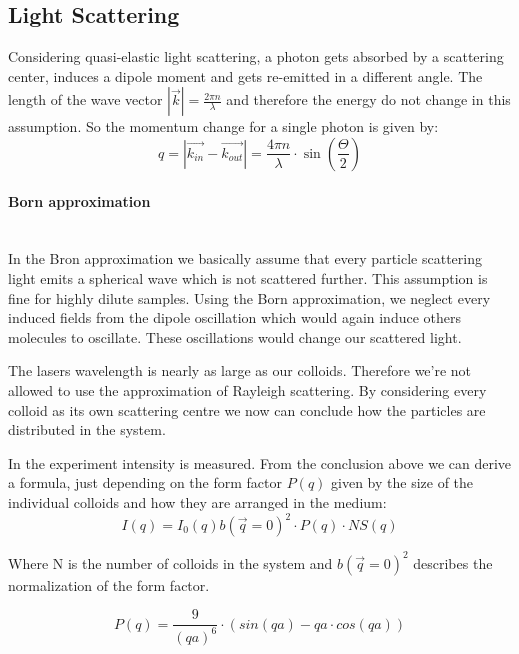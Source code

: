 \documentclass[]{article}
\begin{document}
\subsection{Light Scattering}
Considering quasi-elastic light scattering, a photon gets absorbed by a scattering center, induces a dipole moment and gets re-emitted in a different angle. The length of the wave vector $ |\vec{k}| = \frac{2\pi n}{\lambda}$ and therefore the energy do not change in this assumption. So the momentum change for a single photon is given by:
\begin{equation}\label{eq:momentum}
q= |\vec{k_{in}} - \vec{k_{out}}| = \frac{4\pi n}{\lambda} \cdot \sin \left( \dfrac{\Theta}{2} \right)  
\end{equation}

\paragraph{Born approximation}\mbox{}\\
In the Bron approximation we basically assume that every particle scattering light emits a spherical wave which is not scattered further. This assumption is fine for highly dilute samples.
Using the Born approximation, we neglect every induced fields from the dipole oscillation which would again induce others molecules to oscillate. These oscillations would change our scattered light.

The lasers wavelength is nearly as large as our colloids. Therefore we're not allowed to use the approximation of Rayleigh scattering. By considering every colloid as its own scattering centre we now can conclude how the particles are distributed in the system.

In the experiment intensity is measured. From the conclusion above we can derive a formula, just depending on the form factor $P(q)$ given by the size of the individual colloids and how they are arranged in the medium:
\begin{equation} \label{eq:intensity}
I(q) = I_0(q)b(\vec{q}=0)^2 \cdot P(q) \cdot NS(q)
\end{equation}

Where N is the number of colloids in the system and $b(\vec{q}=0)^2$ describes the normalization of the form factor.

\begin{equation}\label{eq:form}
P(q)= \frac{9}{(qa)^6} \cdot (sin(qa) - qa \cdot cos(qa))
\end{equation}
\end{document}
